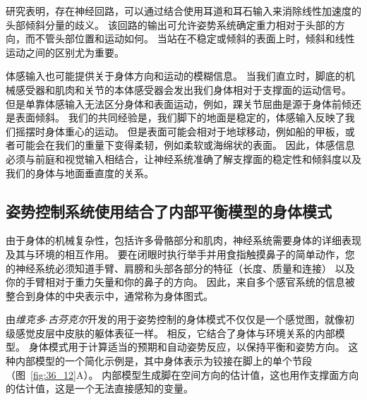 研究表明，存在神经回路，可以通过结合使用耳道和耳石输入来消除线性加速度的头部倾斜分量的歧义。
该回路的输出可允许姿势系统确定重力相对于头部的方向，而不管头部位置和运动如何。
当站在不稳定或倾斜的表面上时，倾斜和线性运动之间的区别尤为重要。


体感输入也可能提供关于身体方向和运动的模糊信息。
当我们直立时，脚底的机械感受器和肌肉和关节的本体感受器会发出我们身体相对于支撑面的运动信号。
但是单靠体感输入无法区分身体和表面运动，例如，踝关节屈曲是源于身体前倾还是表面倾斜。
我们的共同经验是，我们脚下的地面是稳定的，体感输入反映了我们摇摆时身体重心的运动。
但是表面可能会相对于地球移动，例如船的甲板，或者可能会在我们的重量下变得柔韧，例如柔软或海绵状的表面。
因此，体感信息必须与前庭和视觉输入相结合，让神经系统准确了解支撑面的稳定性和倾斜度以及我们的身体与地面垂直度的关系。



\subsection{姿势控制系统使用结合了内部平衡模型的身体模式}

由于身体的机械复杂性，包括许多骨骼部分和肌肉，神经系统需要身体的详细表现及其与环境的相互作用。
要在闭眼时执行举手并用食指触摸鼻子的简单动作，您的神经系统必须知道手臂、肩膀和头部各部分的特征（长度、质量和连接） 以及你的手臂相对于重力矢量和你的鼻子的方向。
因此，来自多个感官系统的信息被整合到身体的中央表示中，通常称为身体图式。


由\textit{维克多$\cdot$古芬克尔}开发的用于姿势控制的身体模式不仅仅是一个感觉图，就像初级感觉皮层中皮肤的躯体表征一样。
相反，它结合了身体与环境关系的内部模型。
身体模式用于计算适当的预期和自动姿势反应，以保持平衡和姿势方向。
这种内部模型的一个简化示例是，其中身体表示为铰接在脚上的单个节段（图~\ref{fig:36_12}A）。
内部模型生成脚在空间方向的估计值，这也用作支撑面方向的估计值，这是一个无法直接感知的变量。


